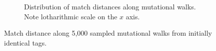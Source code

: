 \begin{figure}[!htbp]
\begin{center}
\begin{subfigure}[b]{\linewidth}
\begin{minipage}{\linewidth}
\end{minipage}
\begin{minipage}{\linewidth}
\caption{
Distribution of match distances along mutational walks.
Note lotharithmic scale on the $x$ axis.
}
\end{minipage}
\end{subfigure}

\caption{
Match distance along 5,000 sampled mutational walks from initially identical tags.
}
\label{fig:mutational_walk_barplot}

\end{center}
\end{figure}
